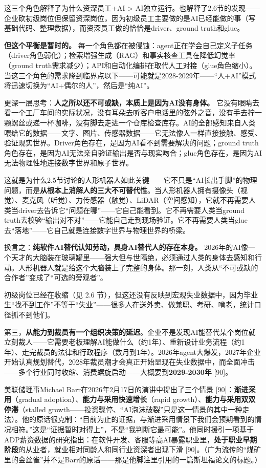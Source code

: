 \documentclass[11pt,a4paper]{ctexart}
\begin{document}
这三个角色解释了为什么资深员工+AI > AI独立运行。也解释了2.6节的发现——企业砍初级岗位但保留资深岗位，因为初级员工主要做的是AI已经能做的事（写基础代码、整理数据），而资深员工做的恰恰是driver、ground truth和glue。

\textbf{但这个平衡是暂时的。} 每一个角色都在被侵蚀：agent正在学会自己定义子任务（driver角色弱化）；检索增强生成（RAG）和事实核查工具在降低幻觉率（ground truth需求减少）；API和自动化编排在取代人工对接（glue角色缩小）。当这三个角色的需求降到临界点以下——可能就是2028-2029年——“人+AI”模式将迅速切换为“AI+偶尔的人”，然后是“纯AI”。

更深一层思考：\textbf{人之所以还不可或缺，本质上是因为AI没有身体。} 它没有眼睛去看一个工厂车间的实际状况，没有耳朵去听客户电话里的弦外之音，没有手去拧一颗螺丝或递一杯咖啡，没有脚去走进一个仓库检查库存。AI的全部感知来自人类喂给它的数据——文字、图片、传感器数据——它无法像人一样直接接触、感受、验证现实世界。Driver角色存在，是因为AI看不到需要解决的问题；ground truth角色存在，是因为AI无法亲自验证输出是否与现实吻合；glue角色存在，是因为AI无法物理性地连接数字世界和原子世界。

这就是为什么2.5节讨论的人形机器人如此关键——它不只是“AI长出手脚”的物理问题，而是\textbf{从根本上消解人的三大不可替代性}。当人形机器人拥有摄像头（视觉）、麦克风（听觉）、力传感器（触觉）、LiDAR（空间感知），它就不再需要人类当driver去告诉它“问题在哪”——它自己能看到。它不再需要人类当ground truth去校验“输出对不对”——它能自己走到现场验证。它不再需要人类当glue去“落地”——它自己就是连接数字世界与物理世界的桥梁。

换言之：\textbf{纯软件AI替代认知劳动，具身AI替代人的存在本身。} 2026年的AI像一个天才的大脑装在玻璃罐里——强大但与世隔绝，必须通过人类的身体去感知和行动。人形机器人就是给这个大脑装上了完整的身体。那一刻，人类从“不可或缺的合作者”变成了“可选的旁观者”。

初级岗位已经在收缩（见 2.6 节），但这还没有反映到宏观失业数据中，因为毕业生“找不到工作”不等于“失业”——很多人在送外卖、做兼职、考研、啃老，统计口径抓不到他们。

第三，\textbf{从能力到裁员有一个组织决策的延迟}。企业不是发现AI能替代某个岗位就立刻裁人——它需要老板理解AI能做什么（约1年）、重新设计业务流程（约1年）、走完裁员的法律和行政程序（数月到1年）。2026年agent大爆发，2027年企业开始认真规划替代，2028年裁员潮才会真正开始显现在失业数据中，而全面冲击——多个行业同时收缩、消费螺旋启动——大概要到\textbf{2029-2030年}{} [90]。

美联储理事Michael Barr在2026年2月17日的演讲中提出了三个情景 [90]：\textbf{渐进采用}（gradual adoption）、\textbf{能力与采用快速增长}（rapid growth）、\textbf{能力与采用双双停滞}（stalled growth——投资骤停、“AI泡沫破裂”只是这一情景的其中一种走法）。他的原话很克制：“目前为止的证据，与渐进采用情景下我们会预期看到的情况相符。”这是“证据暂时对得上”，不是“我判断它最可能”。他同时援引一项基于ADP薪资数据的研究指出：在软件开发、客服等高AI暴露职业里，\textbf{处于职业早期阶段}的从业者，就业相对同龄人和同行业资深者出现下滑 [90]。（广为流传的“煤矿里的金丝雀”并不是Barr的原话——那是他脚注里引用的一篇斯坦福论文的标题。）
\end{document}
